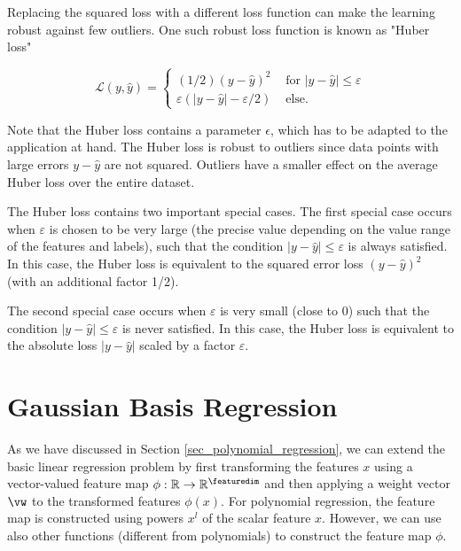 \documentclass[12pt]{report}
\begin{document}
Replacing the squared loss with a different loss function can 
make the learning robust against few outliers. One such robust loss function is 
known as "Huber loss" \cite{HuberRobustBook}

\begin{equation}
\mathcal{L}(y,\hat{y}) = \begin{cases} (1/2) (y-\hat{y})^{2} & \mbox{ for } |y-\hat{y}| \leq   \varepsilon \\ 
\varepsilon(|y-\hat{y}| - \varepsilon/2) & \mbox{ else. }\end{cases}
\end{equation}

Note that the Huber loss contains a parameter $\epsilon$, which has to be adapted 
to the application at hand. The Huber loss is robust to outliers since data points 
with large errors $y - \hat{y}$ are not squared. Outliers have a smaller effect on 
the average Huber loss over the entire dataset. 

The Huber loss contains two important special cases. The first special case occurs when $\varepsilon$ is chosen 
to be very large (the precise value depending on the value range of the features and labels), such that the 
condition $|y-\hat{y}| \leq \varepsilon$ is always satisfied. In this case, the Huber loss is equivalent to the 
squared error loss $(y-\hat{y})^{2}$ (with an additional factor 1/2). 

The second special case occurs when $\varepsilon$ is very small (close to $0$) such that 
the condition $|y-\hat{y}| \leq \varepsilon$ is never satisfied. In this case, the Huber loss 
is equivalent to the absolute loss $|y - \hat{y}|$ scaled by a factor $\varepsilon$.

\section{Gaussian Basis Regression}
\label{sec_linbasreg}
As we have discussed in Section \ref{sec_polynomial_regression}, we can extend the basic linear 
regression problem by first transforming the features $x$ using a vector-valued feature map $\phi: \mathbb{R} \rightarrow \mathbb{R}^{\featuredim}$ 
and then applying a weight vector $\vw$ to the transformed features $\phi(x)$. For polynomial regression, 
the feature map is constructed using powers $x^{l}$ of the scalar feature $x$. However, we can use 
also other functions (different from polynomials) to construct the feature map $\phi$. 
\end{document}
